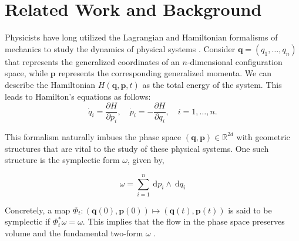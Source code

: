 \section{Related Work and Background}
\label{relatedwork}

Physicists have long utilized the Lagrangian and Hamiltonian formalisms of mechanics to study the dynamics of physical systems \cite{kibble2004classical}. Consider $\mathbf q=\left(q_1, \ldots, q_n\right)$ that represents the generalized coordinates of an $n$-dimensional configuration space, while ${\mathbf p}$ represents the corresponding generalized momenta. We can describe the Hamiltonian $H(\mathbf q, \mathbf p, t)$ as the total energy of the system. This leads to Hamilton's equations as follows:
\begin{equation}
    \dot{q}_i=\frac{\partial H}{\partial p_i}, \quad \dot{p}_i=-\frac{\partial H}{\partial q_i}, \quad i=1, \ldots, n.
\end{equation}

This formalism naturally imbues the phase space $(\mathbf q, \mathbf p) \in \mathbb{R}^{2 d}$ with geometric structures that are vital to the study of these physical systems. One such structure is the symplectic form $\omega$, given by,

\begin{equation}
    \omega=\sum_{i=1}^n \mathrm{~d} p_i \wedge \mathrm{~d} q_i
\end{equation}

Concretely, a map $\Phi_t:(\mathbf q(0), \mathbf p(0)) \mapsto(\mathbf q(t), \mathbf p(t))$ is said to be symplectic if $\Phi_t^* \omega=\omega$. This implies that the flow in the phase space preserves volume and the fundamental two-form $\omega$ \cite{royer1991wigner}. 


